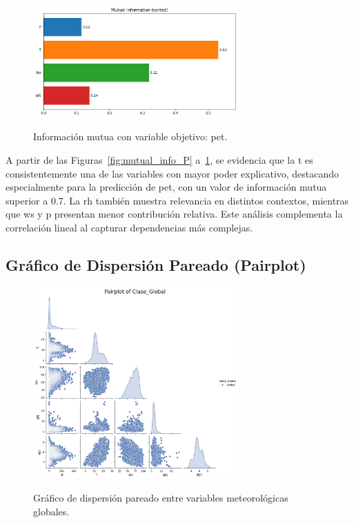 \begin{figure}[htbp]
    \centering
    \caption{Información mutua con variable objetivo: \gls{pet}.}
    \includegraphics[width=0.7\textwidth]{resultados/global/bivariado/mutual_info_PET.png}
    \label{fig:mutual_info_PET}
\end{figure}

A partir de las Figuras~\ref{fig:mutual_info_P} a~\ref{fig:mutual_info_PET}, se evidencia que la \gls{t} es consistentemente una de las variables con mayor poder explicativo, destacando especialmente para la predicción de \gls{pet}, con un valor de información mutua superior a 0.7. La \gls{rh} también muestra relevancia en distintos contextos, mientras que \gls{ws} y \gls{p} presentan menor contribución relativa. Este análisis complementa la correlación lineal al capturar dependencias más complejas.

\subsection{Gráfico de Dispersión Pareado (Pairplot)}

\begin{figure}[htbp]
    \centering
    \caption{Gráfico de dispersión pareado entre variables meteorológicas globales.}
    \includegraphics[width=0.7\textwidth]{resultados/global/bivariado/pairplot_global.png}
    \label{fig:pairplot_global}
\end{figure}

